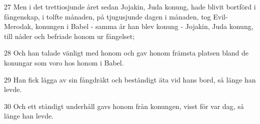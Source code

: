 \par 27 Men i det trettiosjunde året sedan Jojakin, Juda konung, hade blivit bortförd i fångenskap, i tolfte månaden, på tjugusjunde dagen i månaden, tog Evil-Merodak, konungen i Babel - samma år han blev konung - Jojakin, Juda konung, till nåder och befriade honom ur fängelset;
\par 28 Och han talade vänligt med honom och gav honom främsta platsen bland de konungar som voro hos honom i Babel.
\par 29 Han fick lägga av sin fångdräkt och beständigt äta vid hans bord, så länge han levde.
\par 30 Och ett ständigt underhåll gavs honom från konungen, visst för var dag, så länge han levde.



